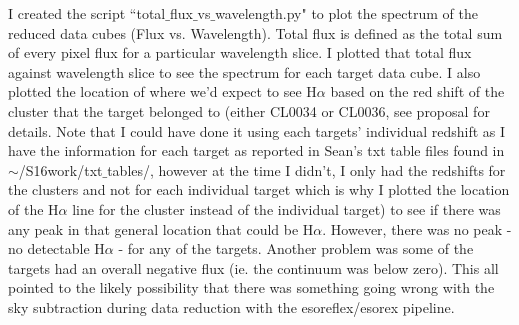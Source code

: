 \documentclass[10pt,letterpaper]{article}
\begin{document}
I created the script ``total$\_$flux$\_$vs$\_$wavelength.py" to plot the spectrum of the reduced data cubes (Flux vs. Wavelength). Total flux is defined as the total sum of every pixel flux for a particular wavelength slice. I plotted that total flux against wavelength slice to see the spectrum for each target data cube. I also plotted the location of where we'd expect to see H$\alpha$ based on the red shift of the cluster that the target belonged to (either CL0034 or CL0036, see proposal for details. Note that I could have done it using each targets' individual redshift as I have the information for each target as reported in Sean's txt table files found in $\sim$/S16work/txt$\_$tables/, however at the time I didn't, I only had the redshifts for the clusters and not for each individual target which is why I plotted the location of the H$\alpha$ line for the cluster instead of the individual target) to see if there was any peak in that general location that could be H$\alpha$. However, there was no peak - no detectable H$\alpha$ - for any of the targets. Another problem was some of the targets had an overall negative flux (ie. the continuum was below zero). This all pointed to the likely possibility that there was something going wrong with the sky subtraction during data reduction with the esoreflex/esorex pipeline.
\end{document}

